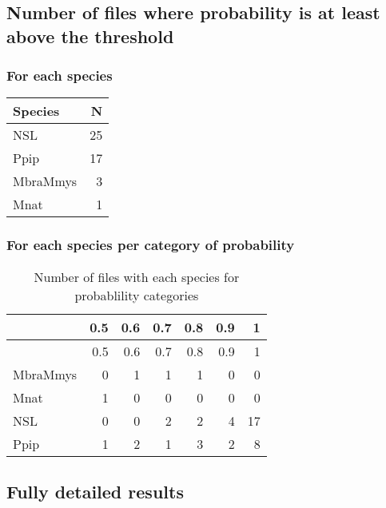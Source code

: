 \documentclass[]{article}
\begin{document}
\subsection{Number of files where probability is at least above the
threshold}\label{number-of-files-where-probability-is-at-least-above-the-threshold}

\subsubsection{For each species}\label{for-each-species}

\begin{longtable}[]{@{}lr@{}}
\toprule
Species & N\tabularnewline
\midrule
\endhead
NSL & 25\tabularnewline
Ppip & 17\tabularnewline
MbraMmys & 3\tabularnewline
Mnat & 1\tabularnewline
\bottomrule
\end{longtable}

\subsubsection{For each species per category of
probability}\label{for-each-species-per-category-of-probability}

\begin{longtable}[]{@{}lrrrrrr@{}}
\caption{Number of files with each species for probablility
categories}\tabularnewline
\toprule
& 0.5 & 0.6 & 0.7 & 0.8 & 0.9 & 1\tabularnewline
\midrule
\endfirsthead
\toprule
& 0.5 & 0.6 & 0.7 & 0.8 & 0.9 & 1\tabularnewline
\midrule
\endhead
MbraMmys & 0 & 1 & 1 & 1 & 0 & 0\tabularnewline
Mnat & 1 & 0 & 0 & 0 & 0 & 0\tabularnewline
NSL & 0 & 0 & 2 & 2 & 4 & 17\tabularnewline
Ppip & 1 & 2 & 1 & 3 & 2 & 8\tabularnewline
\bottomrule
\end{longtable}

\subsection{Fully detailed results}\label{fully-detailed-results}
\end{document}
